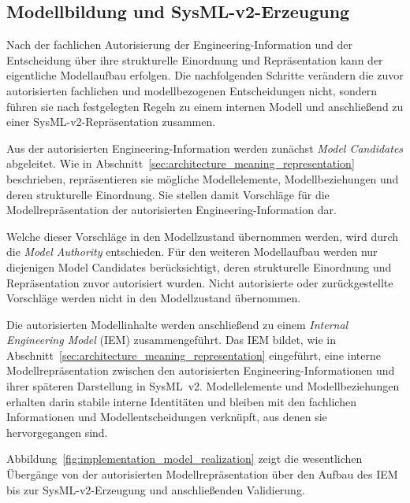 \subsection{Modellbildung und SysML-v2-Erzeugung}
\label{sec:implementation_model_realization}

Nach der fachlichen Autorisierung der Engineering-Information und der
Entscheidung über ihre strukturelle Einordnung und Repräsentation kann der
eigentliche Modellaufbau erfolgen. Die nachfolgenden Schritte verändern die
zuvor autorisierten fachlichen und modellbezogenen Entscheidungen nicht,
sondern führen sie nach festgelegten Regeln zu einem internen Modell und
anschließend zu einer SysML-v2-Repräsentation zusammen.

Aus der autorisierten Engineering-Information werden zunächst
\emph{Model Candidates} abgeleitet. Wie in
Abschnitt~\ref{sec:architecture_meaning_representation} beschrieben,
repräsentieren sie mögliche Modellelemente, Modellbeziehungen und deren
strukturelle Einordnung. Sie stellen damit Vorschläge für die
Modellrepräsentation der autorisierten Engineering-Information dar.

Welche dieser Vorschläge in den Modellzustand übernommen werden, wird durch
die \emph{Model Authority} entschieden. Für den weiteren Modellaufbau werden
nur diejenigen Model Candidates berücksichtigt, deren strukturelle
Einordnung und Repräsentation zuvor autorisiert wurden. Nicht autorisierte
oder zurückgestellte Vorschläge werden nicht in den Modellzustand
übernommen.

Die autorisierten Modellinhalte werden anschließend zu einem
\emph{Internal Engineering Model} (IEM) zusammengeführt. Das IEM bildet,
wie in Abschnitt~\ref{sec:architecture_meaning_representation} eingeführt,
eine interne Modellrepräsentation zwischen den autorisierten
Engineering-Informationen und ihrer späteren Darstellung in SysML~v2.
Modellelemente und Modellbeziehungen erhalten darin stabile interne
Identitäten und bleiben mit den fachlichen Informationen und
Modellentscheidungen verknüpft, aus denen sie hervorgegangen sind.

Abbildung~\ref{fig:implementation_model_realization} zeigt die wesentlichen
Übergänge von der autorisierten Modellrepräsentation über den Aufbau des IEM
bis zur SysML-v2-Erzeugung und anschließenden Validierung.

